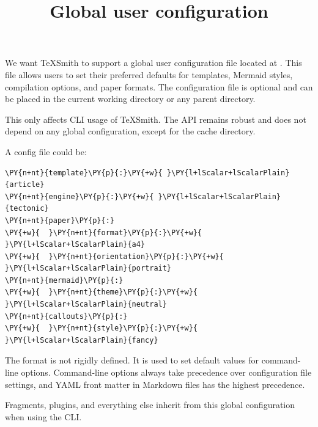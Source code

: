 \documentclass[a4paper,twoside]{article}
\title{Global user configuration}
\author{}\date{}
\begin{document}
\maketitle
We want TeXSmith to support a global user configuration file located at . This file allows users to set their preferred defaults for templates, Mermaid styles, compilation options, and paper formats. The configuration file is optional and can be placed in the current working directory or any parent directory.

This only affects CLI usage of TeXSmith. The API remains robust and does not depend on any global configuration, except for the cache directory.

A config file could be:
\begin{tscode}[lang=yaml, engine=pygments]
\begin{Verbatim}[commandchars=\\\{\},breaklines, breakanywhere, commandchars=\\\{\}]
\PY{n+nt}{template}\PY{p}{:}\PY{+w}{ }\PY{l+lScalar+lScalarPlain}{article}
\PY{n+nt}{engine}\PY{p}{:}\PY{+w}{ }\PY{l+lScalar+lScalarPlain}{tectonic}
\PY{n+nt}{paper}\PY{p}{:}
\PY{+w}{  }\PY{n+nt}{format}\PY{p}{:}\PY{+w}{ }\PY{l+lScalar+lScalarPlain}{a4}
\PY{+w}{  }\PY{n+nt}{orientation}\PY{p}{:}\PY{+w}{ }\PY{l+lScalar+lScalarPlain}{portrait}
\PY{n+nt}{mermaid}\PY{p}{:}
\PY{+w}{  }\PY{n+nt}{theme}\PY{p}{:}\PY{+w}{ }\PY{l+lScalar+lScalarPlain}{neutral}
\PY{n+nt}{callouts}\PY{p}{:}
\PY{+w}{  }\PY{n+nt}{style}\PY{p}{:}\PY{+w}{ }\PY{l+lScalar+lScalarPlain}{fancy}
\end{Verbatim}
\end{tscode}
The format is not rigidly defined. It is used to set default values for command-line options. Command-line options always take precedence over configuration file settings, and YAML front matter in Markdown files has the highest precedence.

Fragments, plugins, and everything else inherit from this global configuration when using the CLI.
\end{document}
